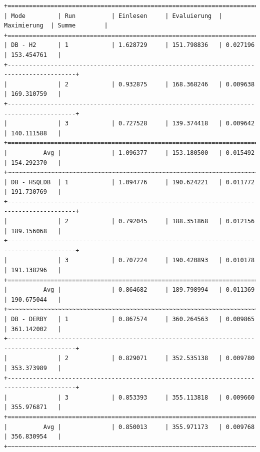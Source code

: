 \documentclass[draft,final]{vutinfth} %
\begin{document}
\begin{lstlisting}[float,basicstyle=\tiny,caption={Benchmark DB \textbf{ohne} Indizes, Datei: lubm-ex-20-17.sparql.xml},label={lst:dboi17}]
+=========================================================================================+
| Mode         | Run          | Einlesen     | Evaluierung  | Maximierung  | Summe        | 
+=========================================================================================+
| DB - H2      | 1            | 1.628729     | 151.798836   | 0.027196     | 153.454761   | 
+-----------------------------------------------------------------------------------------+
|              | 2            | 0.932875     | 168.368246   | 0.009638     | 169.310759   | 
+-----------------------------------------------------------------------------------------+
|              | 3            | 0.727528     | 139.374418   | 0.009642     | 140.111588   | 
+=========================================================================================+
|          Avg |              | 1.096377     | 153.180500   | 0.015492     | 154.292370   | 
+~~~~~~~~~~~~~~~~~~~~~~~~~~~~~~~~~~~~~~~~~~~~~~~~~~~~~~~~~~~~~~~~~~~~~~~~~~~~~~~~~~~~~~~~~+
| DB - HSQLDB  | 1            | 1.094776     | 190.624221   | 0.011772     | 191.730769   | 
+-----------------------------------------------------------------------------------------+
|              | 2            | 0.792045     | 188.351868   | 0.012156     | 189.156068   | 
+-----------------------------------------------------------------------------------------+
|              | 3            | 0.707224     | 190.420893   | 0.010178     | 191.138296   | 
+=========================================================================================+
|          Avg |              | 0.864682     | 189.798994   | 0.011369     | 190.675044   | 
+~~~~~~~~~~~~~~~~~~~~~~~~~~~~~~~~~~~~~~~~~~~~~~~~~~~~~~~~~~~~~~~~~~~~~~~~~~~~~~~~~~~~~~~~~+
| DB - DERBY   | 1            | 0.867574     | 360.264563   | 0.009865     | 361.142002   | 
+-----------------------------------------------------------------------------------------+
|              | 2            | 0.829071     | 352.535138   | 0.009780     | 353.373989   | 
+-----------------------------------------------------------------------------------------+
|              | 3            | 0.853393     | 355.113818   | 0.009660     | 355.976871   | 
+=========================================================================================+
|          Avg |              | 0.850013     | 355.971173   | 0.009768     | 356.830954   | 
+~~~~~~~~~~~~~~~~~~~~~~~~~~~~~~~~~~~~~~~~~~~~~~~~~~~~~~~~~~~~~~~~~~~~~~~~~~~~~~~~~~~~~~~~~+
\end{lstlisting}
\end{document}
